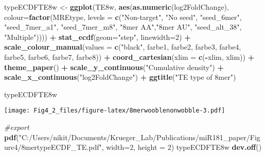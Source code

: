 \documentclass[
]{article}
\newenvironment{Shaded}{\begin{snugshade}}{\end{snugshade}}
\newcommand{\AttributeTok}[1]{\textcolor[rgb]{0.13,0.29,0.53}{#1}}
\newcommand{\CommentTok}[1]{\textcolor[rgb]{0.56,0.35,0.01}{\textit{#1}}}
\newcommand{\DecValTok}[1]{\textcolor[rgb]{0.00,0.00,0.81}{#1}}
\newcommand{\FunctionTok}[1]{\textcolor[rgb]{0.13,0.29,0.53}{\textbf{#1}}}
\newcommand{\NormalTok}[1]{#1}
\newcommand{\OtherTok}[1]{\textcolor[rgb]{0.56,0.35,0.01}{#1}}
\newcommand{\SpecialCharTok}[1]{\textcolor[rgb]{0.81,0.36,0.00}{\textbf{#1}}}
\newcommand{\StringTok}[1]{\textcolor[rgb]{0.31,0.60,0.02}{#1}}
\begin{document}
\begin{Shaded}
\begin{Highlighting}[]
\NormalTok{typeECDFTE8w }\OtherTok{\textless{}{-}} \FunctionTok{ggplot}\NormalTok{(TE8w, }\FunctionTok{aes}\NormalTok{(}\FunctionTok{as.numeric}\NormalTok{(log2FoldChange), }
                              \AttributeTok{colour=}\FunctionTok{factor}\NormalTok{(MREtype, }\AttributeTok{levels =} \FunctionTok{c}\NormalTok{(}\StringTok{"Non{-}target"}\NormalTok{, }\StringTok{"No seed"}\NormalTok{, }\StringTok{"seed\_6mer"}\NormalTok{, }\StringTok{"seed\_7mer\_a1"}\NormalTok{, }\StringTok{"seed\_7mer\_m8"}\NormalTok{, }\StringTok{"8mer AA"}\NormalTok{,}\StringTok{"8mer AU"}\NormalTok{, }\StringTok{"seed\_alt\_38"}\NormalTok{, }\StringTok{"Multiple"}\NormalTok{)))) }\SpecialCharTok{+} 
  \FunctionTok{stat\_ecdf}\NormalTok{(}\AttributeTok{geom=}\StringTok{"step"}\NormalTok{, }\AttributeTok{linewidth=}\DecValTok{2}\NormalTok{) }\SpecialCharTok{+}
  \FunctionTok{scale\_colour\_manual}\NormalTok{(}\AttributeTok{values =} \FunctionTok{c}\NormalTok{(}\StringTok{"black"}\NormalTok{, farbe1, farbe2, farbe3, farbe4, farbe5, farbe6, farbe7, farbe8)) }\SpecialCharTok{+}
  \FunctionTok{coord\_cartesian}\NormalTok{(}\AttributeTok{xlim =} \FunctionTok{c}\NormalTok{(}\SpecialCharTok{{-}}\NormalTok{xlim, xlim)) }\SpecialCharTok{+} 
  \FunctionTok{theme\_paper}\NormalTok{() }\SpecialCharTok{+}
  \FunctionTok{scale\_y\_continuous}\NormalTok{(}\StringTok{"Cumulative density"}\NormalTok{) }\SpecialCharTok{+} \FunctionTok{scale\_x\_continuous}\NormalTok{(}\StringTok{"log2FoldChange"}\NormalTok{) }\SpecialCharTok{+}
  \FunctionTok{ggtitle}\NormalTok{(}\StringTok{"TE type of 8mer"}\NormalTok{)}

\NormalTok{typeECDFTE8w}
\end{Highlighting}
\end{Shaded}

\texttt{[image: Fig4\_2\_files/figure-latex/8merwooblenonwobble-3.pdf]}

\begin{Shaded}
\begin{Highlighting}[]
\CommentTok{\#export}
\FunctionTok{pdf}\NormalTok{(}\StringTok{"C:/Users/nikit/Documents/Krueger\_Lab/Publications/miR181\_paper/Figure4/8mertypeECDF\_TE.pdf"}\NormalTok{, }\AttributeTok{width=}\DecValTok{2}\NormalTok{, }\AttributeTok{height =} \DecValTok{2}\NormalTok{)}
\NormalTok{typeECDFTE8w}
\FunctionTok{dev.off}\NormalTok{()}
\end{Highlighting}
\end{Shaded}
\end{document}
